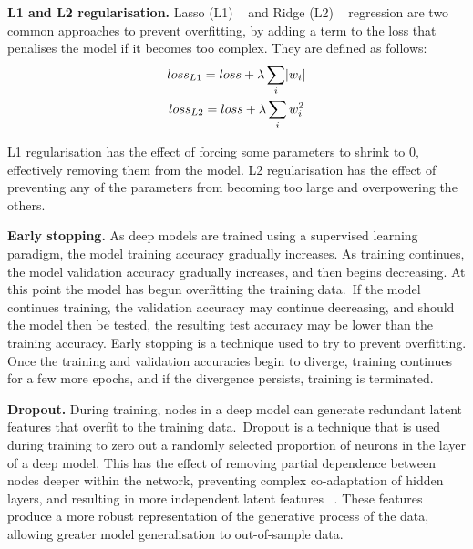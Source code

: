 \noindent \textbf{L1 and L2 regularisation.} Lasso (L1) \unskip ~\citep{tibshirani1996regression} and Ridge (L2) \unskip ~\citep{hoerl1970ridge} regression are two common approaches to prevent overfitting, by adding a term to the loss that penalises the model if it becomes too complex. They are defined as follows:
\begin{subequations}
	\begin{gather}
		loss_{L1} = loss + \lambda\sum_i\abs{w_i}  \\
		loss_{L2} = loss + \lambda\sum_iw_i^2
	\end{gather}
\end{subequations}

\noindent L1 regularisation has the effect of forcing some parameters to shrink to 0, effectively removing them from the model. L2 regularisation has the effect of preventing any of the parameters from becoming too large and overpowering the others. \par

\noindent \textbf{Early stopping.} As deep models are trained using a supervised learning paradigm, the model training accuracy gradually increases. As training continues, the model validation accuracy gradually increases, and then begins decreasing. At this point the model has begun overfitting the training data.\ If the model continues training, the validation accuracy may continue decreasing, and should the model then be tested, the resulting test accuracy may be lower than the training accuracy. Early stopping is a technique used to try to prevent overfitting. Once the training and validation accuracies begin to diverge, training continues for a few more epochs, and if the divergence persists, training is terminated. \par

\noindent \textbf{Dropout.} During training, nodes in a deep model can generate redundant latent features that overfit to the training data.\ Dropout is a technique that is used during training to zero out a randomly selected proportion of neurons in the layer of a deep model. This has the effect of removing partial dependence between nodes deeper within the network, preventing complex co-adaptation of hidden layers, and resulting in more independent latent features \unskip ~\citep{hinton2012improving}. These features produce a more robust representation of the generative process of the data, allowing greater model generalisation to out-of-sample data. \par

